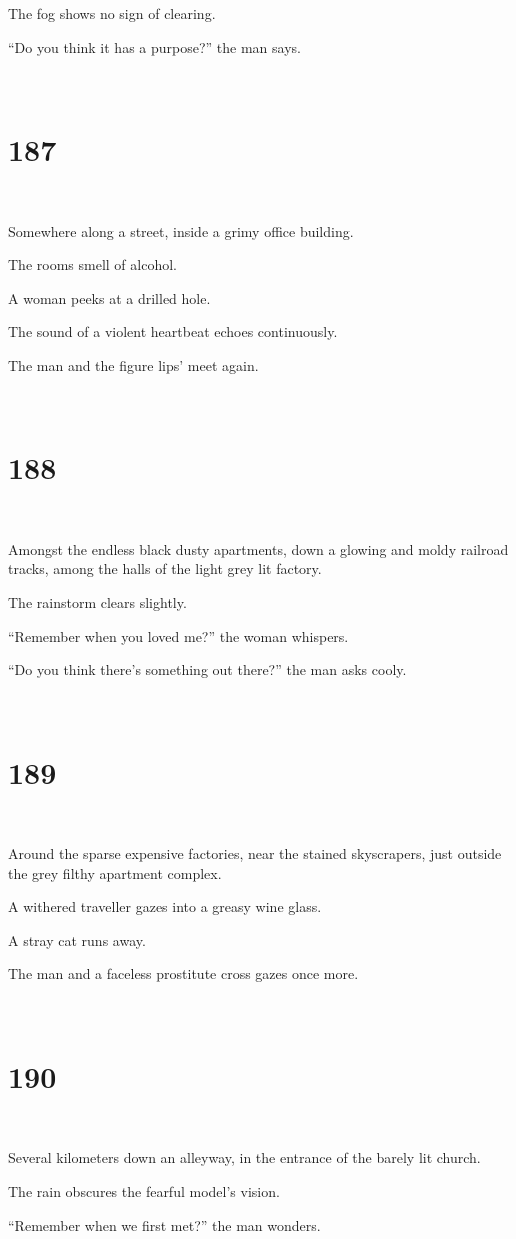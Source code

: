 \documentclass{report}
\begin{document}
The fog shows no sign of clearing.

``Do you think it has a purpose?'' the man says.

~
\chapter*{187}
~

Somewhere along a street, inside a grimy office building.

The rooms smell of alcohol.

A woman peeks at a drilled hole.

The sound of a violent heartbeat echoes continuously.

The man and the figure lips' meet again.

~
\chapter*{188}
~

Amongst the endless black dusty apartments, down a glowing and moldy railroad tracks, among the halls of the light grey lit factory.

The rainstorm clears slightly.

``Remember when you loved me?'' the woman whispers.

``Do you think there's something out there?'' the man asks cooly.

~
\chapter*{189}
~

Around the sparse expensive factories, near the stained skyscrapers, just outside the grey filthy apartment complex.

A withered traveller gazes into a greasy wine glass.

A stray cat runs away.

The man and a faceless prostitute cross gazes once more.

~
\chapter*{190}
~

Several kilometers down an alleyway, in the entrance of the barely lit church.

The rain obscures the fearful model's vision.

``Remember when we first met?'' the man wonders.
\end{document}
